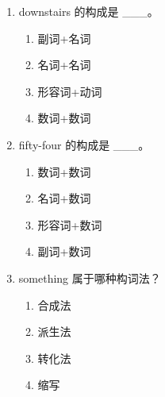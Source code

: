 \documentclass[11pt,a4paper]{ctexart}
\begin{document}
\begin{enumerate}[leftmargin=*,itemsep=4pt]
\begin{enumerate}[label=\Alph*.,leftmargin=2em,itemsep=1pt,topsep=2pt]
\item 数词+名词
\end{enumerate}
\item downstairs 的构成是 \_\_\_。
\begin{enumerate}[label=\Alph*.,leftmargin=2em,itemsep=1pt,topsep=2pt]
\item 副词+名词
\item 名词+名词
\item 形容词+动词
\item 数词+数词
\end{enumerate}
\item fifty-four 的构成是 \_\_\_。
\begin{enumerate}[label=\Alph*.,leftmargin=2em,itemsep=1pt,topsep=2pt]
\item 数词+数词
\item 名词+数词
\item 形容词+数词
\item 副词+数词
\end{enumerate}
\item something 属于哪种构词法？
\begin{enumerate}[label=\Alph*.,leftmargin=2em,itemsep=1pt,topsep=2pt]
\item 合成法
\item 派生法
\item 转化法
\item 缩写
\end{enumerate}
\end{enumerate}
\end{document}
